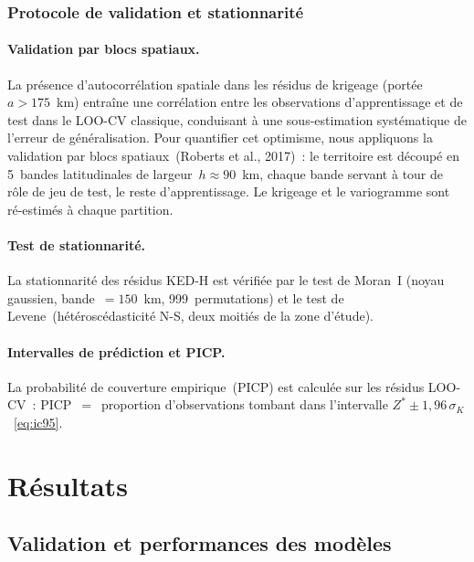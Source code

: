 \documentclass[10pt,a4paper,twocolumn]{article}
\begin{document}
	\subsubsection{Protocole de validation et stationnarité}
	\label{subsec:validation_proto}

	\paragraph{Validation par blocs spatiaux.}
	La présence d'autocorrélation spatiale dans les résidus de krigeage
	(portée $a>175$~km) entraîne une corrélation entre les observations
	d'apprentissage et de test dans le LOO-CV classique, conduisant à
	une sous-estimation systématique de l'erreur de généralisation.
	Pour quantifier cet optimisme, nous appliquons la validation par blocs
	spatiaux~(Roberts et al., 2017)~: le territoire est découpé en
	5~bandes latitudinales de largeur~$h\approx90$~km, chaque bande
	servant à tour de rôle de jeu de test, le reste d'apprentissage.
	Le krigeage et le variogramme sont ré-estimés à chaque partition.

	\paragraph{Test de stationnarité.}
	La stationnarité des résidus KED-H est vérifiée par le test de
	Moran~I (noyau gaussien, bande~$=150$~km, 999~permutations)
	et le test de Levene~(hétéroscédasticité N-S, deux moitiés
	de la zone d'étude).

	\paragraph{Intervalles de prédiction et PICP.}
	La probabilité de couverture empirique~(PICP) est calculée sur les
	résidus LOO-CV~: PICP~$=$~proportion d'observations tombant dans
	l'intervalle $Z^*\pm 1{,}96\,\sigma_K$~\eqref{eq:ic95}.

	\section{Résultats}
	\label{sec:resultats}
	
	\subsection{Validation et performances des modèles}
	\label{subsec:loo_resultats}
	
\end{document}
